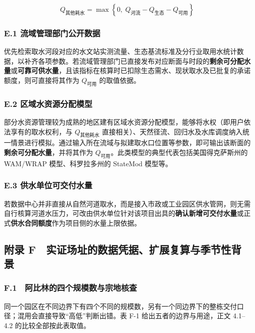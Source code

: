 \[
Q_{\text{其他耗水}} = \max\left\{0,\; Q_{\text{河流}} - Q_{\text{生态}} - Q_{\text{可用}}\right\}
\]

\subsubsection{E.1 流域管理部门公开数据}

优先检索取水河段对应的水文站实测流量、生态基流标准及分行业取用水统计数据，以补齐各项参数。若流域管理部门已直接发布对应断面与时段的\textbf{剩余可分配水量}或\textbf{可靠可供水量}，且该指标在核算时已扣除生态需水、现状取水及已批复的承诺额度，则可直接将其作为 $Q_{\text{可用}}$ 的取值依据。\cite{q1bref02,q1bref03,q1bref08,q1bref09}

\subsubsection{E.2 区域水资源分配模型}

部分水资源管理较为成熟的地区建有区域水资源分配模型，能够将水权（即用户依法享有的取水权利，与 $Q_{\text{其他耗水}}$ 直接相关）、天然径流、回归水及水库调度纳入统一情景进行模拟。通过输入所在流域与拟建取水口位置等参数，即可输出该断面的\textbf{剩余可分配水量}，并将其作为 $Q_{\text{可用}}$。此类模型的典型代表包括美国得克萨斯州的 WAM/WRAP 模型、科罗拉多州的 StateMod 模型等。\cite{q1bref06,q1bref10}

\subsubsection{E.3 供水单位可交付水量}

若数据中心并非直接从自然河道取水，而是接入市政或工业园区供水管网，则无需自行核算河道水压力，可改由供水单位针对该项目出具的\textbf{确认新增可交付水量}或正式\textbf{供水合同额度}作为项目侧的水量上限依据。

\subsection{附录 F　实证场址的数据凭据、扩展复算与季节性背景}

\subsubsection{F.1　阿比林的四个规模数与宗地核查}

同一个园区在不同边界下有四个不同的规模数，另有一个同边界下的整栋交付口径；混用会直接导致“高低”判断出错。表 F-1 给出五者的边界与用途，正文 4.1–4.2 的比较全部按此表取值。

